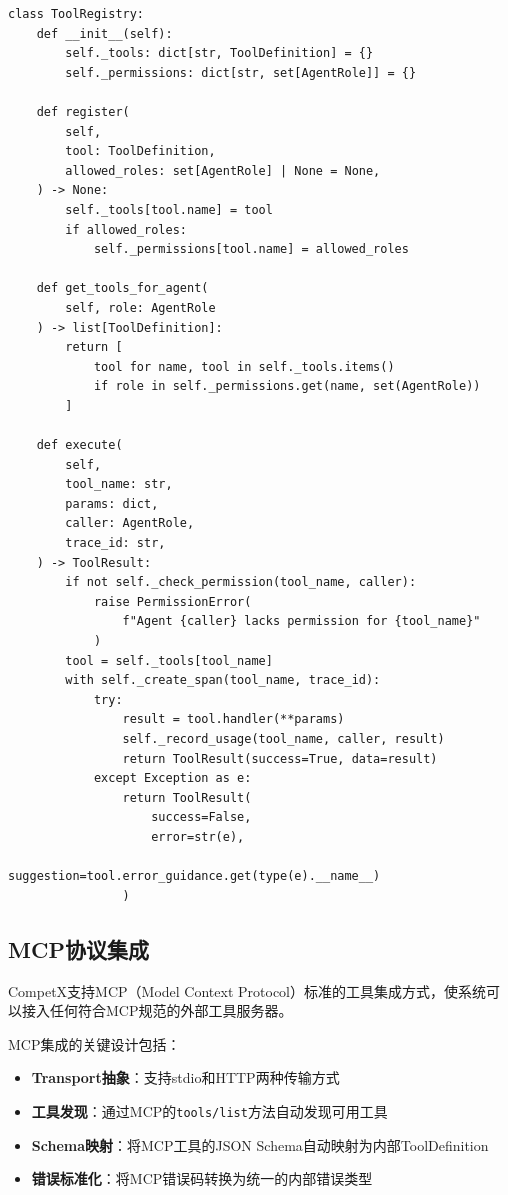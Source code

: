 \documentclass[12pt,a4paper]{ctexrep}
\begin{document}
\begin{lstlisting}[language=Python3,caption=Tool Registry核心实现,label=lst:tool-registry]
class ToolRegistry:
    def __init__(self):
        self._tools: dict[str, ToolDefinition] = {}
        self._permissions: dict[str, set[AgentRole]] = {}

    def register(
        self,
        tool: ToolDefinition,
        allowed_roles: set[AgentRole] | None = None,
    ) -> None:
        self._tools[tool.name] = tool
        if allowed_roles:
            self._permissions[tool.name] = allowed_roles

    def get_tools_for_agent(
        self, role: AgentRole
    ) -> list[ToolDefinition]:
        return [
            tool for name, tool in self._tools.items()
            if role in self._permissions.get(name, set(AgentRole))
        ]

    def execute(
        self,
        tool_name: str,
        params: dict,
        caller: AgentRole,
        trace_id: str,
    ) -> ToolResult:
        if not self._check_permission(tool_name, caller):
            raise PermissionError(
                f"Agent {caller} lacks permission for {tool_name}"
            )
        tool = self._tools[tool_name]
        with self._create_span(tool_name, trace_id):
            try:
                result = tool.handler(**params)
                self._record_usage(tool_name, caller, result)
                return ToolResult(success=True, data=result)
            except Exception as e:
                return ToolResult(
                    success=False,
                    error=str(e),
                    suggestion=tool.error_guidance.get(type(e).__name__)
                )
\end{lstlisting}

\subsection{MCP协议集成}

CompetX支持MCP（Model Context Protocol）\cite{mcp2025}标准的工具集成方式，使系统可以接入任何符合MCP规范的外部工具服务器。

MCP集成的关键设计包括：

\begin{itemize}[leftmargin=2em]
\item \textbf{Transport抽象}：支持stdio和HTTP两种传输方式
\item \textbf{工具发现}：通过MCP的\texttt{tools/list}方法自动发现可用工具
\item \textbf{Schema映射}：将MCP工具的JSON Schema自动映射为内部ToolDefinition
\item \textbf{错误标准化}：将MCP错误码转换为统一的内部错误类型
\end{itemize}
\end{document}
